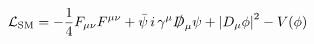 \[
\mathcal{L}_{\mathrm{SM}} = -\frac{1}{4} F_{\mu\nu} F^{\mu\nu}
+ \bar{\psi}\, i\, \gamma^\mu \slashed{D}_\mu \psi
+ \left| D_\mu \phi \right|^2 - V(\phi)
\]
